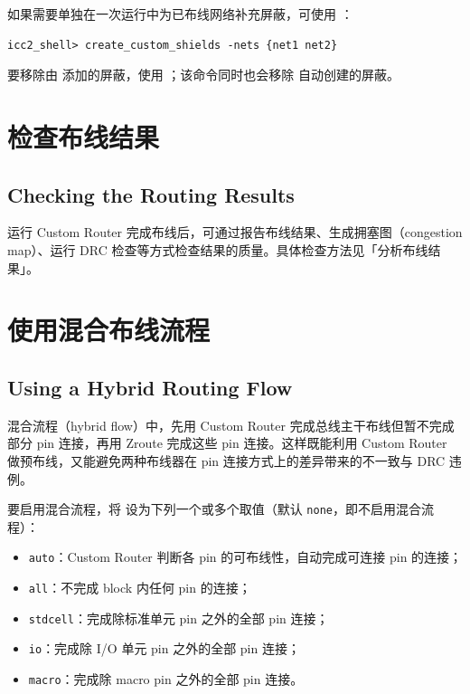 如果需要单独在一次运行中为已布线网络补充屏蔽，可使用 ：

\begin{lstlisting}
icc2_shell> create_custom_shields -nets {net1 net2}
\end{lstlisting}

要移除由  添加的屏蔽，使用 ；该命令同时也会移除  自动创建的屏蔽。

\section{检查布线结果}
\subsection*{Checking the Routing Results}

运行 Custom Router 完成布线后，可通过报告布线结果、生成拥塞图（congestion map）、运行 DRC 检查等方式检查结果的质量。具体检查方法见「分析布线结果」。

\section{使用混合布线流程}
\subsection*{Using a Hybrid Routing Flow}

混合流程（hybrid flow）中，先用 Custom Router 完成总线主干布线但暂不完成部分 pin 连接，再用 Zroute 完成这些 pin 连接。这样既能利用 Custom Router 做预布线，又能避免两种布线器在 pin 连接方式上的差异带来的不一致与 DRC 违例。

要启用混合流程，将  设为下列一个或多个取值（默认 \texttt{none}，即不启用混合流程）：
\begin{itemize}
  \item \texttt{auto}：Custom Router 判断各 pin 的可布线性，自动完成可连接 pin 的连接；
  \item \texttt{all}：不完成 block 内任何 pin 的连接；
  \item \texttt{stdcell}：完成除标准单元 pin 之外的全部 pin 连接；
  \item \texttt{io}：完成除 I/O 单元 pin 之外的全部 pin 连接；
  \item \texttt{macro}：完成除 macro pin 之外的全部 pin 连接。
\end{itemize}

